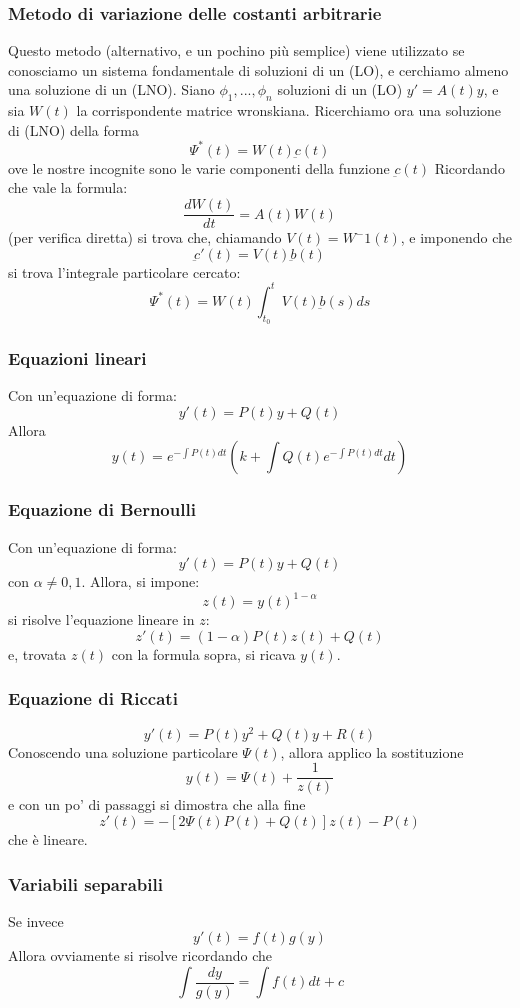 \documentclass[a4paper,12pt]{article}
\begin{document}
\subsubsection{Metodo di variazione delle costanti arbitrarie}
Questo metodo (alternativo, e un pochino più semplice) viene utilizzato se conosciamo un sistema fondamentale di soluzioni di un (LO), e cerchiamo almeno una soluzione di un (LNO).
Siano $\phi_1,...,\phi_n$ soluzioni di un (LO) $y'= A(t)y$, e sia $W(t)$ la corrispondente matrice wronskiana.
Ricerchiamo ora una soluzione di (LNO) della forma
$$\Psi^*(t)=W(t)\underbar{c}(t)$$
ove le nostre incognite sono le varie componenti della funzione $\underbar{c}(t)$
Ricordando che vale la formula:
$$\frac{dW(t)}{dt} = A(t)W(t)$$
(per verifica diretta) si trova che, chiamando $V(t) = W^-1(t)$, e imponendo che $$\underbar{c}'(t) = V(t)\underbar{b}(t)$$
si trova l'integrale particolare cercato:
$$\Psi^*(t)= W(t)\int_{t_0}^t V(t)\underbar{b}(s) ds$$

\subsubsection{Equazioni lineari}
Con un'equazione di forma:
$$y'(t) = P(t)y+Q(t)$$
Allora
$$y(t)=e^{- \displaystyle\int P(t)dt}\left(k + \int Q(t)e^{-\displaystyle\int P(t)dt}dt\right)$$
\subsubsection{Equazione di Bernoulli}
Con un'equazione di forma:
$$y'(t) = P(t)y+Q(t)$$
con $\alpha \neq 0, 1$. Allora, si impone:
$$ z(t)=y(t)^{1-\alpha} $$
si risolve l'equazione lineare in $z$: $$z'(t)=(1-\alpha)P(t)z(t)+Q(t)$$ e, trovata $z(t)$ con la formula sopra, si ricava $y(t)$.

\subsubsection{Equazione di Riccati}
$$y'(t) = P(t)y^2+Q(t)y+R(t)$$
Conoscendo una soluzione particolare $\Psi(t)$, allora applico la sostituzione
$$y(t)=\Psi(t)+\dfrac{1}{z(t)}$$
e con un po' di passaggi si dimostra che alla fine
$$z'(t)= -\left[2\Psi(t)P(t)+Q(t)\right]z(t)-P(t)$$
che è lineare.
\subsubsection{Variabili separabili}
Se invece
$$y'(t) = f(t)g(y)$$
Allora ovviamente si risolve ricordando che
$$\int\dfrac{dy}{g(y)}=\int f(t)dt + c$$
\end{document}

